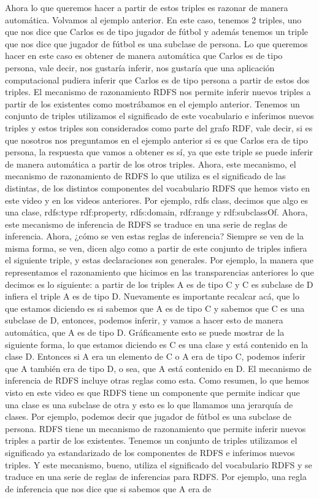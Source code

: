 Ahora lo que queremos hacer a partir de estos triples es razonar de manera automática. Volvamos al ejemplo anterior. En este caso, tenemos 2 triples, uno que nos dice que Carlos es de tipo jugador de fútbol y además tenemos un triple que nos dice que jugador de fútbol es una subclase de persona. Lo que queremos hacer en este caso es obtener de manera automática que Carlos es de tipo persona, vale decir, nos gustaría inferir, nos gustaría que una aplicación computacional pudiera inferir que Carlos es de tipo persona a partir de estos dos triples. El mecanismo de razonamiento RDFS nos permite inferir nuevos triples a partir de los existentes como mostrábamos en el ejemplo anterior. Tenemos un conjunto de triples utilizamos el significado de este vocabulario e inferimos nuevos triples y estos triples son considerados como parte del grafo RDF, vale decir, si es que nosotros nos preguntamos en el ejemplo anterior si es que Carlos era de tipo persona, la respuesta que vamos a obtener es sí, ya que este triple se puede inferir de manera automática a partir de los otros triples. Ahora, este mecanismo, el mecanismo de razonamiento de RDFS lo que utiliza es el significado de las distintas, de los distintos componentes del vocabulario RDFS que hemos visto en este video y en los videos anteriores. Por ejemplo, rdfs class, decimos que algo es una clase, rdfs:type rdf:property, rdfs:domain, rdf:range y rdf:subclassOf. Ahora, este mecanismo de inferencia de RDFS se traduce en una serie de reglas de inferencia. Ahora, ¿cómo se ven estas reglas de inferencia? Siempre se ven de la misma forma, se ven, dicen algo como a partir de este conjunto de triples infiera el siguiente triple, y estas declaraciones son generales. Por ejemplo, la manera que representamos el razonamiento que hicimos en las transparencias anteriores lo que decimos es lo siguiente: a partir de los triples A es de tipo C y C es subclase de D infiera el triple A es de tipo D. Nuevamente es importante recalcar acá, que lo que estamos diciendo es si sabemos que A es de tipo C y sabemos que C es una subclase de D, entonces, podemos inferir, y vamos a hacer esto de manera automática, que A es de tipo D. Gráficamente esto se puede mostrar de la siguiente forma, lo que estamos diciendo es C es una clase y está contenido en la clase D. Entonces si A era un elemento de C o A era de tipo C, podemos inferir que A también era de tipo D, o sea, que A está contenido en D. El mecanismo de inferencia de RDFS incluye otras reglas como esta. Como resumen, lo que hemos visto en este video es que RDFS tiene un componente que permite indicar que una clase es una subclase de otra y esto es lo que llamamos una jerarquía de clases. Por ejemplo, podemos decir que jugador de fútbol es una subclase de persona. RDFS tiene un mecanismo de razonamiento que permite inferir nuevos triples a partir de los existentes. Tenemos un conjunto de triples utilizamos el significado ya estandarizado de los componentes de RDFS e inferimos nuevos triples. Y este mecanismo, bueno, utiliza el significado del vocabulario RDFS y se traduce en una serie de reglas de inferencias para RDFS. Por ejemplo, una regla de inferencia que nos dice que si sabemos que A era de 